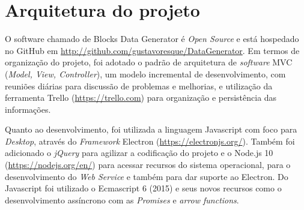 \documentclass[
	12pt,				%
	openright,			%
	twoside,			%
	a4paper,			%
	english,			%
	brazil				%
	]{abntex2}
\begin{document}

		
\chapter{Arquitetura do projeto}\label{cap_trabalho_academico}
	O software chamado de Blocks Data Generator é \emph{Open Source} e está hospedado no GitHub em \url{http://github.com/gustavoresque/DataGenerator}.
	Em termos de organização do projeto, foi adotado o padrão de arquitetura de \emph{software} MVC (\emph{Model, View, Controller}), um modelo incremental de desenvolvimento, com reuniões diárias para discussão de problemas e melhorias, e utilização da ferramenta Trello (\url{https://trello.com}) para organização e persistência das informações.
	\par
	Quanto ao desenvolvimento, foi utilizada a linguagem Javascript com foco para \emph{Desktop}, através do \emph{Framework} Electron (\url{https://electronjs.org/}).
	Também foi adicionado o \emph{jQuery} para agilizar a codificação do projeto e o Node.js 10 (\url{https://nodejs.org/en/}) para acessar recursos do sistema operacional, para o desenvolvimento do \emph{Web Service} e também para dar suporte ao Electron.
	Do Javascript foi utilizado o Ecmascript 6 (2015) e seus novos recursos como o desenvolvimento assíncrono com as \emph{Promises} e \emph{arrow functions}.
	
\end{document}
